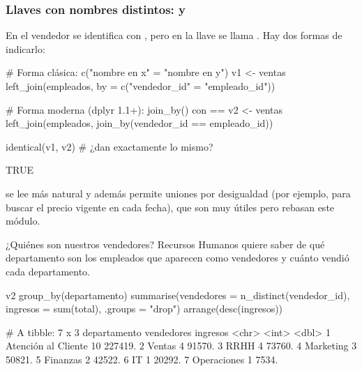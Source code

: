 \subsubsection{Llaves con nombres distintos: \texorpdfstring{}{by = c(...)} y \texorpdfstring{}{join\_by()}}

{\sloppy En  el vendedor se identifica con , pero
en  la llave se llama . Hay dos formas
de indicarlo:\par}

\begin{rcode}
# Forma clásica: c("nombre en x" = "nombre en y")
v1 <- ventas %
  left_join(empleados, by = c("vendedor_id" = "empleado_id"))

# Forma moderna (dplyr 1.1+): join_by() con ==
v2 <- ventas %
  left_join(empleados, join_by(vendedor_id == empleado_id))

identical(v1, v2)       # ¿dan exactamente lo mismo?
\end{rcode}
\begin{rsalida}
[1] TRUE
\end{rsalida}

{\sloppy {} se lee más natural y además permite uniones por
desigualdad (por ejemplo, 
para buscar el precio vigente en cada fecha), que son muy útiles pero
rebasan este módulo.\par}

\begin{ejemplo}{¿Quiénes son nuestros vendedores?}
Recursos Humanos quiere saber de qué departamento son los empleados que
aparecen como vendedores y cuánto vendió cada departamento.
\end{ejemplo}

\begin{rcode}
v2 %
  group_by(departamento) %
  summarise(vendedores = n_distinct(vendedor_id),
            ingresos = sum(total), .groups = "drop") %
  arrange(desc(ingresos))
\end{rcode}
\begin{rsalida}
# A tibble: 7 x 3
  departamento        vendedores ingresos
  <chr>                    <int>    <dbl>
1 Atención al Cliente         10  227419.
2 Ventas                       4   91570.
3 RRHH                         4   73760.
4 Marketing                    3   50821.
5 Finanzas                     2   42522.
6 IT                           1   20292.
7 Operaciones                  1    7534.
\end{rsalida}

